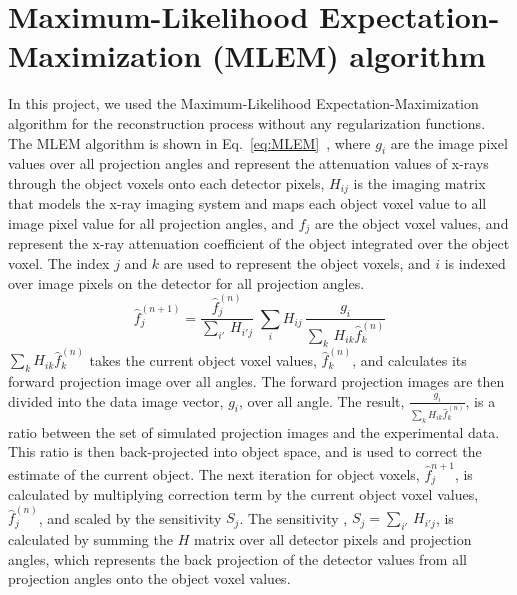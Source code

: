\section{Maximum-Likelihood Expectation-Maximization (MLEM) algorithm }
In this project, we used the Maximum-Likelihood Expectation-Maximization algorithm for the reconstruction process without any regularization functions.  The MLEM algorithm is shown in Eq.~\ref{eq:MLEM}~\citep{EmissionTom2004}, where $g_i$ are the image pixel values over all projection angles and represent the attenuation values of x-rays through the object voxels onto each detector pixels, $H_{ij}$ is the imaging matrix that models the x-ray imaging system and maps each object voxel value to all image pixel value for all projection angles, and $f_{j}$ are the object voxel values, and represent the x-ray attenuation coefficient of the object integrated over the object voxel.  The index $j$ and $k$ are used to represent the object voxels, and $i$ is indexed over image pixels on the detector for all projection angles.
%
\begin{equation}
\hat{f}^{(n+1)}_{j} = \frac{\hat{f}^{(n)}_j}{{\sum\limits_{i'}} \, H_{i'j}} \; 
						\sum\limits_{i} H_{ij} \, \frac{g_{i}}{\sum\limits_{k} \, H_{ik} \hat{f}_{k}^{(n)}}
\label{eq:MLEM}
\end{equation}
%
$\sum\limits_k H_{ik} \hat{f}_k^{(n)}$ takes the current object voxel values, $\hat{f}^{(n)}_k$, and calculates its forward projection image over all angles.  The forward projection images are then divided into the data image vector, $g_i$, over all angle.  The result, $\frac{g_i}{\sum\limits_k H_{ik} \hat{f}_k^{(n)}}$, is a ratio between the set of simulated projection images and the experimental data.  This ratio is then back-projected into object space, and is used to correct the estimate of the current object.  The next iteration for object voxels, $\hat{f}_j^{n+1}$, is calculated by multiplying correction term by the current object voxel values, $\hat{f}_j^{(n)}$, and scaled by the sensitivity $S_j$.  The sensitivity , $S_j = \sum\limits_{i'} \, H_{i' j}$, is calculated by summing the $H$ matrix over all detector pixels and projection angles, which represents the back projection of the detector values from all projection angles onto the object voxel values.

